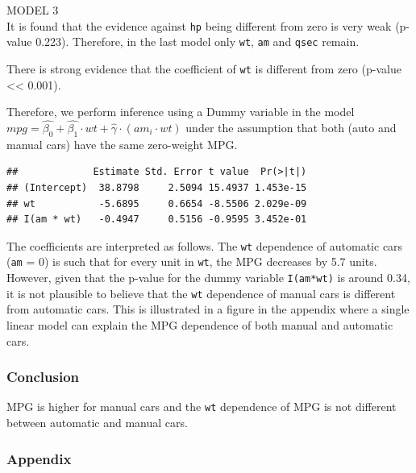 \documentclass[]{article}
\newenvironment{Shaded}{\begin{snugshade}}{\end{snugshade}}
\newcommand{\KeywordTok}[1]{\textcolor[rgb]{0.13,0.29,0.53}{\textbf{{#1}}}}
\newcommand{\DataTypeTok}[1]{\textcolor[rgb]{0.13,0.29,0.53}{{#1}}}
\newcommand{\StringTok}[1]{\textcolor[rgb]{0.31,0.60,0.02}{{#1}}}
\newcommand{\NormalTok}[1]{{#1}}
\begin{document}
MODEL 3\\It is found that the evidence against \texttt{hp} being
different from zero is very weak (p-value 0.223). Therefore, in the last
model only \texttt{wt}, \texttt{am} and \texttt{qsec} remain.

There is strong evidence that the coefficient of \texttt{wt} is
different from zero (p-value \textless{}\textless{} 0.001).

Therefore, we perform inference using a Dummy variable in the model
$mpg = \hat{\beta_0} + \hat{\beta_1} \cdot wt + \hat{\gamma} \cdot (am_i \cdot wt)$
under the assumption that both (auto and manual cars) have the same
zero-weight MPG.

\begin{Shaded}
\end{Shaded}

\begin{verbatim}
##             Estimate Std. Error t value  Pr(>|t|)
## (Intercept)  38.8798     2.5094 15.4937 1.453e-15
## wt           -5.6895     0.6654 -8.5506 2.029e-09
## I(am * wt)   -0.4947     0.5156 -0.9595 3.452e-01
\end{verbatim}

The coefficients are interpreted as follows. The \texttt{wt} dependence
of automatic cars (\texttt{am} = 0) is such that for every unit in
\texttt{wt}, the MPG decreases by 5.7 units. However, given that the
p-value for the dummy variable \texttt{I(am*wt)} is around 0.34, it is
not plausible to believe that the \texttt{wt} dependence of manual cars
is different from automatic cars. This is illustrated in a figure in the
appendix where a single linear model can explain the MPG dependence of
both manual and automatic cars.

\subsubsection{Conclusion}\label{conclusion}

MPG is higher for manual cars and the \texttt{wt} dependence of MPG is
not different between automatic and manual cars.

\subsubsection{Appendix}\label{appendix}
\end{document}
